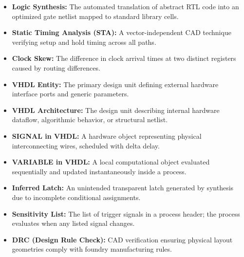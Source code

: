 \documentclass[12pt,a4paper]{article}
\begin{document}
\begin{tcolorbox}[defbox, title={\textbf{One-Line Definitions}}]
\begin{itemize}[leftmargin=*, itemsep=2pt, topsep=0pt]
  \item \textbf{Logic Synthesis:} The automated translation of abstract RTL code into an optimized gate netlist mapped to standard library cells.
  \item \textbf{Static Timing Analysis (STA):} A vector-independent CAD technique verifying setup and hold timing across all paths.
  \item \textbf{Clock Skew:} The difference in clock arrival times at two distinct registers caused by routing differences.
  \item \textbf{VHDL Entity:} The primary design unit defining external hardware interface ports and generic parameters.
  \item \textbf{VHDL Architecture:} The design unit describing internal hardware dataflow, algorithmic behavior, or structural netlist.
  \item \textbf{SIGNAL in VHDL:} A hardware object representing physical interconnecting wires, scheduled with delta delay.
  \item \textbf{VARIABLE in VHDL:} A local computational object evaluated sequentially and updated instantaneously inside a process.
  \item \textbf{Inferred Latch:} An unintended transparent latch generated by synthesis due to incomplete conditional assignments.
  \item \textbf{Sensitivity List:} The list of trigger signals in a process header; the process evaluates when any listed signal changes.
  \item \textbf{DRC (Design Rule Check):} CAD verification ensuring physical layout geometries comply with foundry manufacturing rules.
\end{itemize}
\end{tcolorbox}
\end{document}
